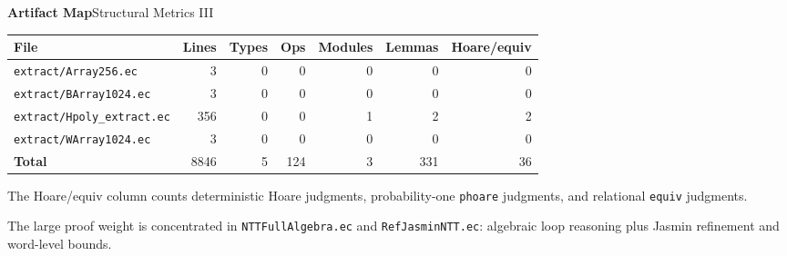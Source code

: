 \documentclass[10pt,aspectratio=1610,compress,dvipsnames]{beamer}
\newcommand{\ec}[1]{\texttt{#1}}
\begin{document}
\begin{frame}{\bfseries Artifact Map}{Structural Metrics III}
\begin{center}
\tiny\renewcommand{\arraystretch}{1.16}
\setlength{\tabcolsep}{4pt}
\begin{tabular}{lrrrrrr}
\toprule[1.2pt]
\textbf{File} & \textbf{Lines} & \textbf{Types} & \textbf{Ops} &
\textbf{Modules} & \textbf{Lemmas} & \textbf{Hoare/equiv} \\
\midrule
\ec{extract/Array256.ec}       &    3 & 0 & 0 & 0 &   0 & 0 \\
\ec{extract/BArray1024.ec}     &    3 & 0 & 0 & 0 &   0 & 0 \\
\ec{extract/Hpoly\_extract.ec} &  356 & 0 & 0 & 1 &   2 & 2 \\
\ec{extract/WArray1024.ec}     &    3 & 0 & 0 & 0 &   0 & 0 \\
\midrule
\textbf{Total}                 & 8846 & 5 & 124 & 3 & 331 & 36 \\
\bottomrule[1.2pt]
\end{tabular}
\end{center}

\vspace{2pt}
\begin{center}
\scriptsize
The Hoare/equiv column counts deterministic Hoare judgments, probability-one
\ec{phoare} judgments, and relational \ec{equiv} judgments.
\end{center}

\vspace{5pt}
\begin{center}
\scriptsize
The large proof weight is concentrated in \ec{NTTFullAlgebra.ec} and
\ec{RefJasminNTT.ec}: algebraic loop reasoning plus Jasmin refinement and
word-level bounds.
\end{center}
\end{frame}
\end{document}
